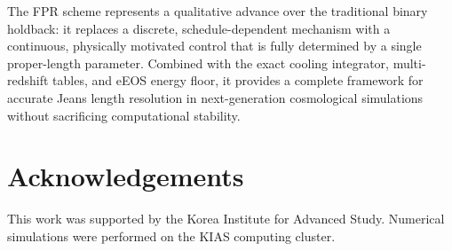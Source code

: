 \documentclass[fleqn,usenatbib]{mnras}
\begin{document}
The FPR scheme represents a qualitative advance over the traditional
binary holdback: it replaces a discrete, schedule-dependent mechanism
with a continuous, physically motivated control that is fully
determined by a single proper-length parameter.  Combined with the
exact cooling integrator, multi-redshift tables, and eEOS energy
floor, it provides a complete framework for accurate Jeans length
resolution in next-generation cosmological simulations without
sacrificing computational stability.


\section*{Acknowledgements}

This work was supported by the Korea Institute for Advanced Study.
Numerical simulations were performed on the KIAS computing cluster.
\end{document}
